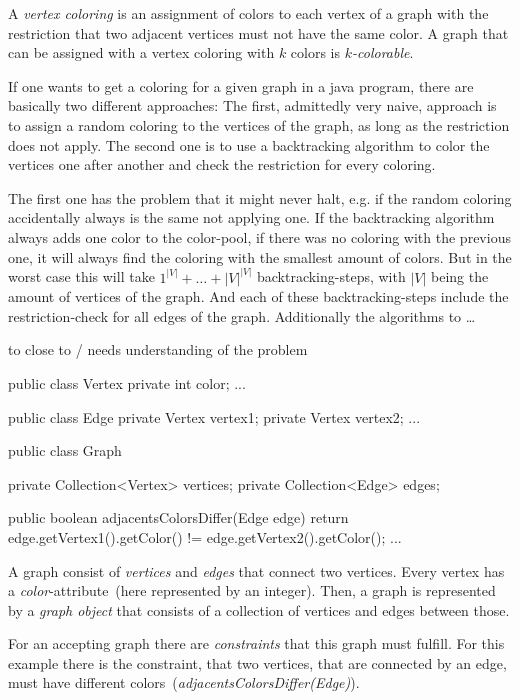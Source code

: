 \documentclass[conference]{IEEEtran}
\begin{document}
A \emph{vertex coloring} is an assignment of colors to each vertex of a graph
with the restriction that two adjacent vertices must not have the same color.
A graph that can be assigned with a vertex coloring with $k$ colors is
\emph{$k$-colorable}.

If one wants to get a coloring for a given graph in a java program, there are
basically two different approaches: The first, admittedly very naive, approach
is to assign a random coloring to the vertices of the graph, as long as the
restriction does not apply. The second one is to use a backtracking algorithm
to color the vertices one after another and check the restriction for every
coloring.

The first one has the problem that it might never halt, e.g. if the random
coloring accidentally always is the same not applying one. If the backtracking
algorithm always adds one color to the color-pool, if there was no coloring
with the previous one, it will always find the coloring with the smallest
amount of colors. But in the worst case this will take \(1^{|V|} + \ldots +
|V|^{|V|} \) backtracking-steps, with \(|V|\) being the amount of vertices of
the graph. And each of these backtracking-steps include the restriction-check
for all edges of the graph. Additionally the algorithms to \ldots

\danger to close to / needs understanding of the problem

\begin{javalisting}[label=lst:graph_coloring,caption=Example]
public class Vertex {
  private int color;
  ...
}

public class Edge {
  private Vertex vertex1;
  private Vertex vertex2;
  ...
}

public class Graph {
  private Collection<Vertex> vertices;
  private Collection<Edge> edges;

  public boolean adjacentsColorsDiffer(Edge edge) {
    return edge.getVertex1().getColor() != edge.getVertex2().getColor();
  }
  ...
}
\end{javalisting}

A graph consist of \emph{vertices} and \emph{edges} that connect two vertices.
Every vertex has a \emph{color}-attribute~(here represented by an integer).
Then, a graph is represented by a \emph{graph object} that consists of a
collection of vertices and edges between those.

For an accepting graph there are \emph{constraints} that this graph must
fulfill. For this example there is the constraint, that two vertices, that are
connected by an edge, must have different
colors~(\emph{adjacentsColorsDiffer(Edge)}).
\end{document}
